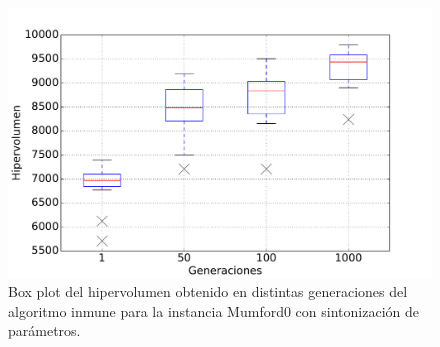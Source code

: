 \begin{figure}[!htb]
\centering
\includegraphics[width=\textwidth]{img/hyp_Mumford0_bp}
\caption{Box plot del hipervolumen obtenido en distintas generaciones del algoritmo inmune para la instancia Mumford0 con sintonización de parámetros.}
\label{fig:hyp_mumford0_bp}
\end{figure}


